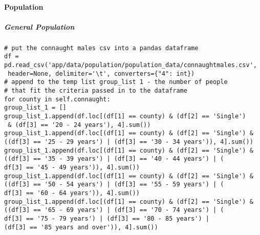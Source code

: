 \paragraph{Population}
\subparagraph{General Population}
\begin{verbatim}
# put the connaught males csv into a pandas dataframe
df = pd.read_csv('app/data/population/population_data/connaughtmales.csv',
 header=None, delimiter='\t', converters={"4": int})
# append to the temp list group_list 1 - the number of people 
# that fit the criteria passed in to the dataframe
for county in self.connaught:
group_list_1 = []
group_list_1.append(df.loc[(df[1] == county) & (df[2] == 'Single')
 & (df[3] == '20 - 24 years'), 4].sum())
group_list_1.append(df.loc[(df[1] == county) & (df[2] == 'Single') &
((df[3] == '25 - 29 years') | (df[3] == '30 - 34 years')), 4].sum())
group_list_1.append(df.loc[(df[1] == county) & (df[2] == 'Single') &
((df[3] == '35 - 39 years') | (df[3] == '40 - 44 years') | (
df[3] == '45 - 49 years')), 4].sum())
group_list_1.append(df.loc[(df[1] == county) & (df[2] == 'Single') &
((df[3] == '50 - 54 years') | (df[3] == '55 - 59 years') | (
df[3] == '60 - 64 years')), 4].sum())
group_list_1.append(df.loc[(df[1] == county) & (df[2] == 'Single') &
((df[3] == '65 - 69 years') | (df[3] == '70 - 74 years') | (
df[3] == '75 - 79 years') | (df[3] == '80 - 85 years') |
(df[3] == '85 years and over')), 4].sum())
\end{verbatim}

